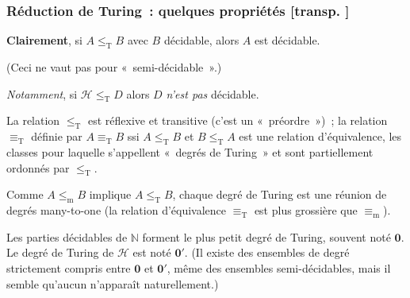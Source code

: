 \documentclass[mathserif,a4paper,aspectratio=169]{beamer}
\renewcommand{\frametitle}[1]{\subsubsection*{#1 {\footnotesize[transp. \insertframenumber]}}}
\begin{document}
\begin{frame}
\frametitle{Réduction de Turing : quelques propriétés}

\textbf{Clairement}, si $A \mathrel{\leq_\mathrm{T}} B$ avec $B$
décidable, alors $A$ est décidable.

{\footnotesize (Ceci \alert{ne vaut pas} pour
  « semi-décidable ».)\par}

\smallskip

\emph{Notamment}, si $\mathscr{H} \mathrel{\leq_\mathrm{T}} D$ alors
$D$ \emph{n'est pas} décidable.

\bigskip

{\footnotesize

La relation $\mathrel{\leq_\mathrm{T}}$ est réflexive et transitive
(c'est un « préordre ») ; la relation $\mathrel{\equiv_\mathrm{T}}$
définie par $A \mathrel{\equiv_\mathrm{T}} B$ ssi $A
\mathrel{\leq_\mathrm{T}} B$ et $B \mathrel{\leq_\mathrm{T}} A$ est
une relation d'équivalence, les classes pour laquelle s'appellent
« degrés de Turing » et sont partiellement ordonnés par
$\mathrel{\leq_\mathrm{T}}$.

\medskip

Comme $A \mathrel{\leq_\mathrm{m}} B$ implique $A
\mathrel{\leq_\mathrm{T}} B$, chaque degré de Turing est une réunion
de degrés many-to-one (la relation d'équivalence
$\mathrel{\equiv_\mathrm{T}}$ est plus grossière que
$\mathrel{\equiv_\mathrm{m}}$).

\medskip

Les parties décidables de $\mathbb{N}$ forment le plus petit degré de
Turing, souvent noté $\mathbf{0}$.  Le degré de Turing de
$\mathscr{H}$ est noté $\mathbf{0'}$.  (Il existe des ensembles de
degré strictement compris entre $\mathbf{0}$ et $\mathbf{0'}$, même
des ensembles semi-décidables, mais il semble qu'aucun n'apparaît
naturellement.)

\par}

\end{frame}
%
\end{document}
